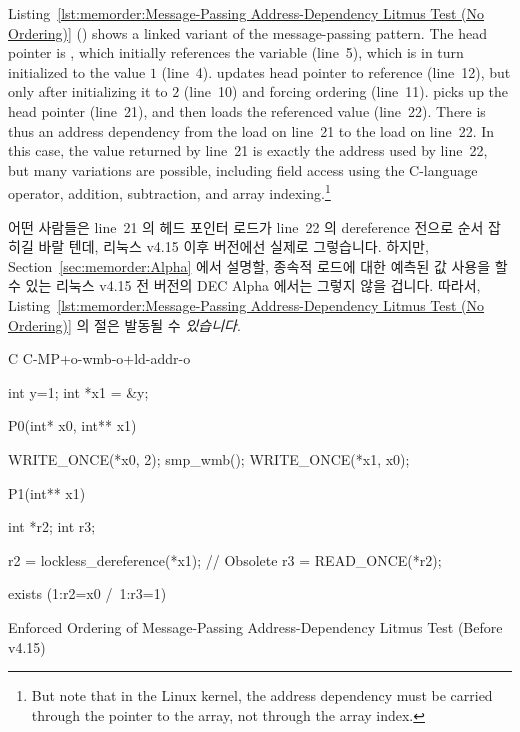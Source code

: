 Listing~\ref{lst:memorder:Message-Passing Address-Dependency Litmus Test (No Ordering)}
()
shows a linked variant of the message-passing pattern.
The head pointer is , which initially
references the  variable  (line~5), which is in turn
initialized to the value $1$ (line~4).
 updates head pointer  to reference  (line~12),
but only after initializing it to $2$ (line~10) and forcing ordering
(line~11).
 picks up the head pointer  (line~21), and then loads
the referenced value (line~22).
There is thus an address dependency from the load on line~21 to the
load on line~22.
In this case, the value returned by line~21 is exactly the address
used by line~22, but many variations are possible,
including field access using the C-language \co{->} operator,
addition, subtraction, and array indexing.\footnote{
	But note that in the Linux kernel, the address dependency must
	be carried through the pointer to the array, not through the
	array index.}
\fi

어떤 사람들은 line~21 의 헤드 포인터 로드가 line~22 의 dereference 전으로 순서
잡히길 바랄 텐데, 리눅스 v4.15 이후 버전에선 실제로 그렇습니다.
하지만,
Section~\ref{sec:memorder:Alpha} 에서 설명할, 종속적 로드에 대한 예측된 값
사용을 할 수 있는 리눅스 v4.15 전 버전의 DEC Alpha 에서는 그렇지 않을 겁니다.
따라서,
Listing~\ref{lst:memorder:Message-Passing Address-Dependency Litmus Test (No Ordering)}
의  절은 발동될 수 \emph{있습니다}.

\begin{listing}[tbp]
{ \scriptsize
\begin{verbbox}[\LstLineNo]
C C-MP+o-wmb-o+ld-addr-o

{
int y=1;
int *x1 = &y;
}

P0(int* x0, int** x1) {

  WRITE_ONCE(*x0, 2);
  smp_wmb();
  WRITE_ONCE(*x1, x0);

}

P1(int** x1) {

  int *r2;
  int r3;

  r2 = lockless_dereference(*x1); // Obsolete
  r3 = READ_ONCE(*r2);

}

exists (1:r2=x0 /\ 1:r3=1)
\end{verbbox}
}
\centering
\theverbbox
\caption{Enforced Ordering of Message-Passing Address-Dependency Litmus Test (Before v4.15)}
\label{lst:memorder:Enforced Ordering of Message-Passing Address-Dependency Litmus Test (Before v4.15)}
\end{listing}

